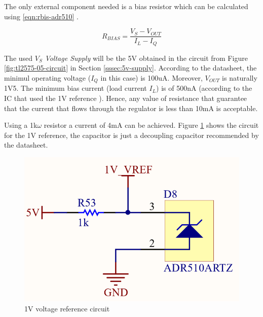 			The only external component needed is a bias resistor which can be calculated using \ref{eqn:rbis-adr510} \cite{adr510artz-datasheet}.

			\begin{equation}
				R_{BIAS} = \frac{V_{S} - V_{OUT}}{I_{L} - I_{Q}}
			\end{equation}

			The used $V_{S}$ \textit{Voltage Supply} will be the 5V obtained in the circuit from Figure \ref{fig:tl2575-05-circuit} in Section \ref{sssec:5v-supply}. According to the datasheet, the minimul operating voltage ($I_{Q}$ in this case) is 100uA. Moreover, $V_{OUT}$ is naturally 1V5. The minimum bias current (load current $I_{L}$) is of 500nA (according to the IC that used the 1V reference \cite{lm2907-datasheet}). Hence, any value of resistance that guarantee that the current that flows through the regulator is less than 10mA is acceptable.
			\par
			Using a 1k$\omega$ resistor a current of 4mA can be achieved. Figure \ref{fig:ADR510ARTZ-circuit} shows the circuit for the 1V reference, the capacitor is just a decoupling capacitor recommended by the datasheet.

			\begin{figure}[htbp]
				\centering
					\includegraphics[scale=1.2]{figuras/fig-ADR510ARTZ-circuit.png}
				\caption{1V voltage reference circuit \cite{ADR510ARTZ-circuit}}
				\label{fig:ADR510ARTZ-circuit}
			\end{figure}	 

